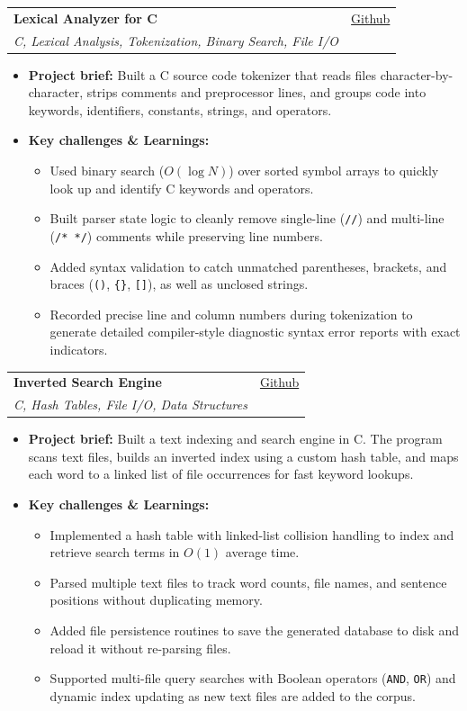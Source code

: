 \documentclass[letterpaper,11pt]{article}
\makeatletter
\newcommand{\resumeItem}[1]{
  \item
    {#1 \vspace{-2pt}}
}
\newcommand{\resumeSubheading}[4]{
  \vspace{-2pt}\item
    \begin{tabular*}{0.97\textwidth}[t]{l@{\extracolsep{\fill}}r}
      \textbf{#1} & #2 \\
      \textit{#3} & {#4} \\
    \end{tabular*}\vspace{-7pt}
}
\newcommand{\resumeItemListStart}{\begin{itemize}[topsep=2pt, itemsep=2pt, parsep=0pt]}
\newcommand{\resumeItemListEnd}{\end{itemize}\vspace{-5pt}}
\makeatother
\begin{document}
    \resumeSubheading
      {Lexical Analyzer for C}{\href{https://github.com/k0-R0/Lexical-Analyzer}{Github}}
      {C, Lexical Analysis, Tokenization, Binary Search, File I/O}{}
      \resumeItemListStart
        \resumeItem{\textbf{Project brief:} Built a C source code tokenizer that reads files character-by-character, strips comments and preprocessor lines, and groups code into keywords, identifiers, constants, strings, and operators.}
        \resumeItem{\textbf{Key challenges \& Learnings:}}
        \resumeItemListStart
            \resumeItem{Used binary search ($O(\log N)$) over sorted symbol arrays to quickly look up and identify C keywords and operators.}
            \resumeItem{Built parser state logic to cleanly remove single-line (\texttt{//}) and multi-line (\texttt{/* */}) comments while preserving line numbers.}
            \resumeItem{Added syntax validation to catch unmatched parentheses, brackets, and braces (\texttt{()}, \texttt{\{\}}, \texttt{[]}), as well as unclosed strings.}
            \resumeItem{Recorded precise line and column numbers during tokenization to generate detailed compiler-style diagnostic syntax error reports with exact indicators.}
        \resumeItemListEnd
      \resumeItemListEnd

    \resumeSubheading
      {Inverted Search Engine}{\href{https://github.com/k0-R0/Inverted_SearchEngine}{Github}}
      {C, Hash Tables, File I/O, Data Structures}{}
      \resumeItemListStart
        \resumeItem{\textbf{Project brief:} Built a text indexing and search engine in C. The program scans text files, builds an inverted index using a custom hash table, and maps each word to a linked list of file occurrences for fast keyword lookups.}
        \resumeItem{\textbf{Key challenges \& Learnings:}}
        \resumeItemListStart
            \resumeItem{Implemented a hash table with linked-list collision handling to index and retrieve search terms in $O(1)$ average time.}
            \resumeItem{Parsed multiple text files to track word counts, file names, and sentence positions without duplicating memory.}
            \resumeItem{Added file persistence routines to save the generated database to disk and reload it without re-parsing files.}
            \resumeItem{Supported multi-file query searches with Boolean operators (\texttt{AND}, \texttt{OR}) and dynamic index updating as new text files are added to the corpus.}
        \resumeItemListEnd
      \resumeItemListEnd
\end{document}

